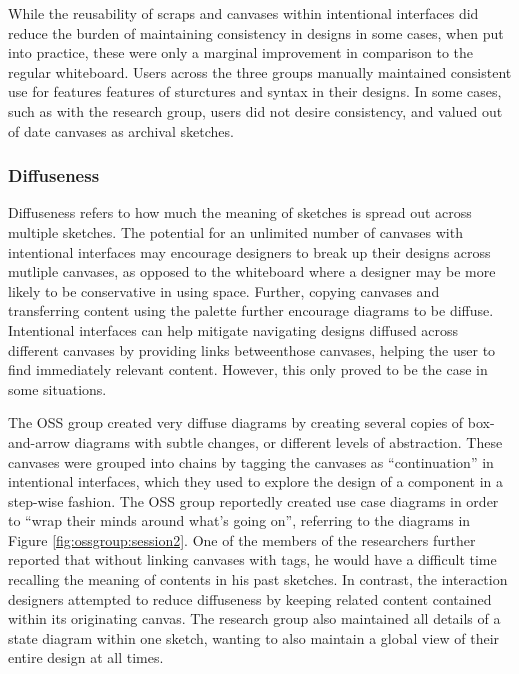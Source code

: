 While the reusability of scraps and canvases within intentional interfaces did reduce the burden of maintaining consistency in designs in some cases, when put into practice, these were only a marginal improvement in comparison to the regular whiteboard. Users across the three groups manually maintained consistent use for features features of sturctures and syntax in their designs. In some cases, such as with the research group, users did not desire consistency, and valued out of date canvases as archival sketches.


\subsubsection{Diffuseness}
Diffuseness refers to how much the meaning of sketches is spread out across multiple sketches. The potential for an unlimited number of canvases with intentional interfaces may encourage designers to break up their designs across mutliple canvases, as opposed to the whiteboard where a designer may be more likely to be conservative in using space. Further, copying canvases and transferring content using the palette further encourage diagrams to be diffuse. Intentional interfaces can help mitigate navigating designs diffused across different canvases by providing links betweenthose  canvases, helping the user to find immediately relevant content.  However, this only proved to be the case in some situations. 

The OSS group created very diffuse diagrams by creating several copies of box-and-arrow diagrams with subtle changes, or different levels of abstraction. These canvases were grouped into chains by tagging the canvases as ``continuation'' in intentional interfaces, which they used to explore the design of a component in a step-wise fashion. The OSS group reportedly created use case diagrams in order to ``wrap their minds around what's going on'', referring to the diagrams in Figure \ref{fig:ossgroup:session2}. One of the members of the researchers further reported that without linking canvases with tags, he would have a difficult time recalling the meaning of contents in his past sketches. In contrast, the interaction designers attempted to reduce diffuseness by keeping related content contained within its originating canvas. The research group also maintained all details of a state diagram within one sketch, wanting to also maintain a global view of their entire design at all times.

